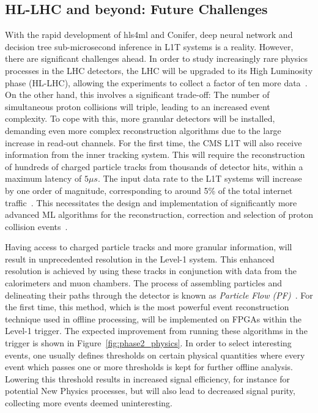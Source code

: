 \documentclass[12pt]{iopart}
\begin{document}
\subsection{HL-LHC and beyond: Future Challenges}
With the rapid development of hls4ml and Conifer, deep neural network and decision tree sub-microsecond inference in L1T systems is a reality. However, there are significant challenges ahead. In order to study increasingly rare physics processes in the LHC detectors, the LHC will be upgraded to its High Luminosity phase (HL-LHC), allowing the experiments to collect a factor of ten more data~\cite{tdr}. On the other hand, this involves a significant trade-off: The number of simultaneous proton collisions will triple, leading to an increased event complexity. To cope with this, more granular detectors will be installed, demanding even more complex reconstruction algorithms due to the large increase in read-out channels. For the first time, the CMS L1T will also receive information from the inner tracking system. This will require the reconstruction of hundreds of charged particle tracks from thousands of detector hits, within a maximum latency of $5\mu s$. The input data rate to the L1T systems will increase by one order of magnitude, corresponding to around 5\% of the total internet traffic~\cite{tdr}. This necessitates the design and implementation of significantly more advanced ML algorithms for the reconstruction, correction and selection of proton collision events~\cite{Elabd2022GNNFPGAs,Brown2023NNPrimaryVertex,Iiyama2021DistanceWeightedGNN,Que2022OptimizingGNN,CMS2022NNAlgorithm,CMS2023ElectronReconstruction,CMS2023ContinualLearning}.

Having access to charged particle tracks and more granular information, will result in unprecedented resolution in the Level-1 system. This enhanced resolution is achieved by using these tracks in conjunction with data from the calorimeters and muon chambers. The process of assembling particles and delineating their paths through the detector is known as \textit{Particle Flow (PF)}~\cite{Sirunyan_2017}. For the first time, this method, which is the most powerful event reconstruction technique used in offline processing, will be implemented on FPGAs within the Level-1 trigger. The expected improvement from running these algorithms in the trigger is shown in Figure~\ref{fig:phase2_physics}. In order to select interesting events, one usually defines thresholds on certain physical quantities where every event which passes one or more thresholds is kept for further offline analysis. Lowering this threshold results in increased signal efficiency, for instance for potential New Physics processes, but will also lead to decreased signal purity, collecting more events deemed uninteresting.
\end{document}
